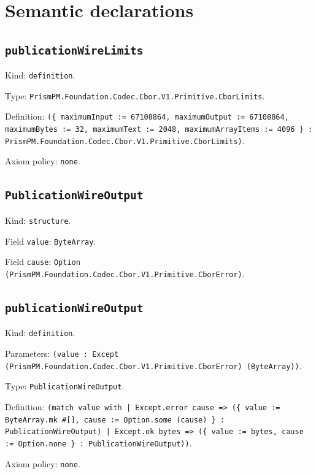 \documentclass[11pt]{article}
\begin{document}
\section*{Semantic declarations}
\subsection*{\texttt{publicationWireLimits}}
\noindent Kind: \texttt{definition}.\par
\noindent Type: \texttt{PrismPM.Foundation.Codec.Cbor.V1.Primitive.CborLimits}.\par
\noindent Definition: \texttt{(\{ maximumInput := 67108864, maximumOutput := 67108864, maximumBytes := 32, maximumText := 2048, maximumArrayItems := 4096 \} : PrismPM.Foundation.Codec.Cbor.V1.Primitive.CborLimits)}.\par
\noindent Axiom policy: \texttt{none}.\par
\subsection*{\texttt{PublicationWireOutput}}
\noindent Kind: \texttt{structure}.\par
\noindent Field \texttt{value}: \texttt{ByteArray}.\par
\noindent Field \texttt{cause}: \texttt{Option (PrismPM.Foundation.Codec.Cbor.V1.Primitive.CborError)}.\par
\subsection*{\texttt{publicationWireOutput}}
\noindent Kind: \texttt{definition}.\par
\noindent Parameters: \texttt{(value : Except (PrismPM.Foundation.Codec.Cbor.V1.Primitive.CborError) (ByteArray))}.\par
\noindent Type: \texttt{PublicationWireOutput}.\par
\noindent Definition: \texttt{(match value with | Except.error cause => (\{ value := ByteArray.mk \#[], cause := Option.some (cause) \} : PublicationWireOutput) | Except.ok bytes => (\{ value := bytes, cause := Option.none \} : PublicationWireOutput))}.\par
\noindent Axiom policy: \texttt{none}.\par
\end{document}
